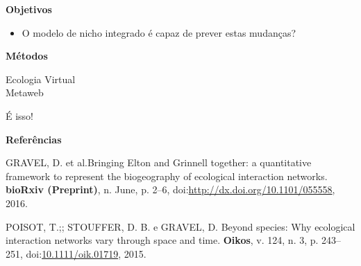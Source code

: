 \documentclass[11pt,ignorenonframetext,]{beamer}
\providecommand{\tightlist}{%
\setlength{\itemsep}{0pt}\setlength{\parskip}{0pt}}
\begin{document}
\begin{frame}{\textbf{Objetivos}}

\begin{itemize}
\tightlist
\item
  O modelo de nicho integrado é capaz de prever estas mudanças?
\end{itemize}

\end{frame}

\begin{frame}{\textbf{Métodos}}

Ecologia Virtual\\
Metaweb

\end{frame}

\begin{frame}{É isso!}

\textbf{Referências}

\hypertarget{refs}{}
\hypertarget{ref-Gravel2016a}{}
GRAVEL, D. et al.Bringing Elton and Grinnell together: a quantitative
framework to represent the biogeography of ecological interaction
networks. \textbf{bioRxiv (Preprint)}, n. June, p. 2--6,
doi:\href{https://doi.org/http://dx.doi.org/10.1101/055558}{http://dx.doi.org/10.1101/055558},
2016.

\hypertarget{ref-Poisot2015}{}
POISOT, T.;; STOUFFER, D. B. e GRAVEL, D. Beyond species: Why ecological
interaction networks vary through space and time. \textbf{Oikos}, v.
124, n. 3, p. 243--251,
doi:\href{https://doi.org/10.1111/oik.01719}{10.1111/oik.01719}, 2015.

\end{frame}
\end{document}

